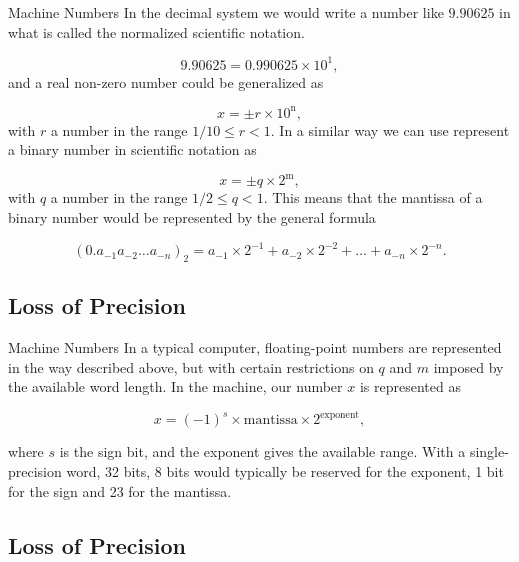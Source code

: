 \documentclass[%
oneside,                 %
final,                   %
10pt]{article}
\begin{document}
\begin{block}{Machine Numbers }
In the decimal system we would write a number like $9.90625$
in what is called the normalized scientific notation.

\[
  9.90625=0.990625\times 10^{1},
\]
and a real non-zero number could be generalized as

\begin{equation}
    x=\pm r\times 10^{{\mbox{n}}},
\end{equation}
with $r$ a number in the range $1/10 \le r < 1$.
In a similar way we can use represent a binary number in
scientific notation as

\begin{equation}
    x=\pm q\times 2^{{\mbox{m}}},
\end{equation}
with $q$ a number in the range $1/2 \le q < 1$.
This means that the mantissa of a binary number would be represented by
the general formula

\begin{equation}
(0.a_{-1}a_{-2}\dots a_{-n})_2=a_{-1}\times 2^{-1}
+a_{-2}\times 2^{-2}+\dots+a_{-n}\times 2^{-n}.
\end{equation}
\end{block}

\subsection{Loss of Precision}

\begin{block}{Machine Numbers }
In a typical computer, floating-point numbers are represented
in the way described above, but with certain restrictions
on $q$ and $m$ imposed by the available word length.
In the machine, our
number $x$ is represented as

\begin{equation}
    x=(-1)^s\times {\mbox{mantissa}}\times 2^{{\mbox{exponent}}},
\end{equation}

where $s$ is the sign bit, and the exponent gives the available range.
With a single-precision word, 32 bits, 8 bits would typically be reserved
for the exponent,  1 bit for the sign and 23 for the mantissa.
\end{block}

\subsection{Loss of Precision}
\end{document}
